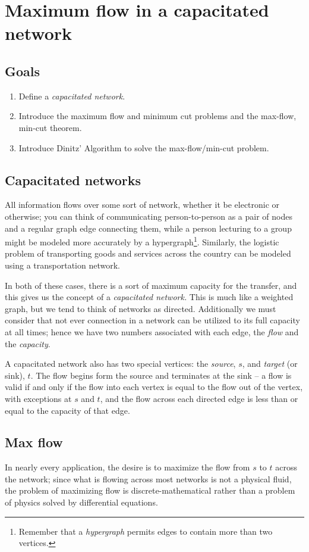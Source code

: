 \documentclass[m3380-lec-main.tex]{subfiles}
\begin{document}
\chapter{Maximum flow in a capacitated network}

\section*{Goals}
\begin{enumerate}[1.~]\setlength{\itemsep}{0pt}
\item Define a \emph{capacitated network}.
\item Introduce the maximum flow and minimum cut problems and the max-flow, min-cut theorem.
\item Introduce Dinitz' Algorithm to solve the max-flow/min-cut problem.
\end{enumerate}

\section{Capacitated networks}
All information flows over some sort of network, whether it be electronic or otherwise; you can think of communicating person-to-person as a pair of nodes and a regular graph edge connecting them, while a person lecturing to a group might be modeled more accurately by a hypergraph\footnote{Remember that a \emph{hypergraph} permits edges to contain more than two vertices.}. Similarly, the logistic problem of transporting goods and services across the country can be modeled using a transportation network.

In both of these cases, there is a sort of maximum capacity for the transfer, and this gives us the concept of a \emph{capacitated network.} This is much like a weighted graph, but we tend to think of networks as directed. Additionally we must consider that not ever connection in a network can be utilized to its full capacity at all times; hence we have two numbers associated with each edge, the \emph{flow} and the \emph{capacity}. 

A capacitated network also has two special vertices: the \emph{source}, $s$, and \emph{target} (or sink), $t$. The flow begins form the source and terminates at the sink -- a flow is valid if and only if the flow into each vertex is equal to the flow out of the vertex, with exceptions at $s$ and $t$, and the flow across each directed edge is less than or equal to the capacity of that edge.

\section{Max flow}
In nearly every application, the desire is to maximize the flow from $s$ to $t$ across the network; since what is flowing across most networks is not a physical fluid, the problem of maximizing flow is discrete-mathematical rather than a problem of physics solved by differential equations.
\end{document}
